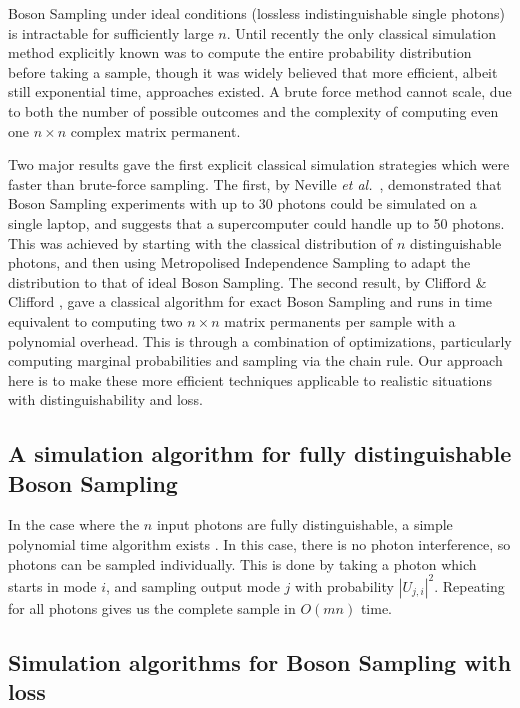 Boson Sampling under ideal conditions (lossless indistinguishable single photons) is intractable for sufficiently large $n$. 
Until recently the only classical simulation method explicitly known was to compute the entire probability distribution before taking a sample, though it was widely believed that more efficient, albeit still exponential time, approaches existed. 
A brute force method cannot scale, due to both the number of possible outcomes and the complexity of computing even one $n\times n$ complex matrix permanent.

Two major results gave the first explicit classical simulation strategies which were faster than brute-force sampling. 
The first, by Neville \textit{et al.}~\cite{neville2017}, demonstrated that Boson Sampling experiments with up to 30 photons could be simulated on a single laptop, and suggests that a supercomputer could handle up to 50 photons. 
This was achieved by starting with the classical distribution of $n$ distinguishable photons, and then using Metropolised Independence Sampling to adapt the distribution to that of ideal Boson Sampling.
The second result, by Clifford \& Clifford \cite{clifford2017}, gave a classical algorithm for exact Boson Sampling and runs in time equivalent to computing two $n \times n$ matrix  permanents per sample with a polynomial overhead. 
This is through a combination of optimizations, particularly computing marginal probabilities and sampling via the chain rule.
Our approach here is to make these more efficient techniques applicable to realistic situations with distinguishability and loss.

\subsection{A simulation algorithm for fully distinguishable Boson Sampling}
\label{ssec:fully-dist-sim}

In the case where the $n$ input photons are fully distinguishable, a simple polynomial time algorithm exists \cite{aaronson2014}. In this case, there is no photon interference, so photons can be sampled individually. This is done by taking a photon which starts in mode $i$, and sampling output mode $j$ with probability $|U_{j,i}|^2$. Repeating for all photons gives us the complete sample in $O(mn)$ time.

\subsection{Simulation algorithms for Boson Sampling with loss}

